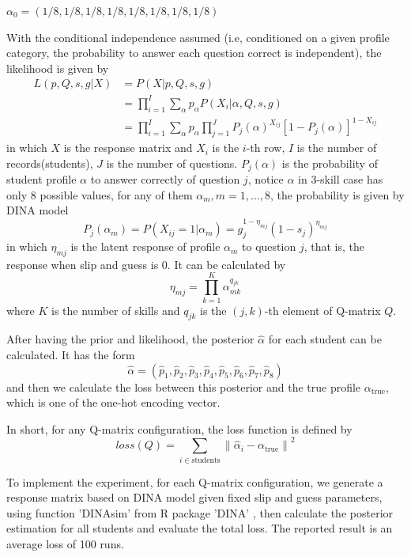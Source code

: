 \documentclass{edm_template}
\begin{document}
$\alpha_0=(1/8,1/8,1/8,1/8,1/8,1/8,1/8,1/8)$ 

With the conditional independence assumed (i.e, conditioned on a given profile category, the probability to answer each question correct is independent), the likelihood is given by \cite{de2009dina} \cite{chen2015statistical}
\begin{equation}
\begin{split}
L(p,Q,s,g|X) & = P(X|p,Q,s,g) \\
& = \prod_{i=1}^I \sum_{\alpha}p_{\alpha}P(X_i|\alpha, Q, s, g) \\
& = \prod_{i=1}^I \sum_{\alpha}p_{\alpha} \prod_{j=1}^J P_j(\alpha)^{X_{ij}}[1-P_j(\alpha)]^{1-X_{ij}}
\end{split}
\end{equation}
in which $X$ is the response matrix and $X_i$ is the $i$-th row, $I$ is the number of records(students), $J$ is the  number of questions. $P_j(\alpha)$ is the probability of student profile $\alpha$ to answer correctly of question $j$, notice $\alpha$ in 3-skill case has only 8 possible values, for any of them $\alpha_m, m =1,...,8$, the probability is given by DINA model
$$ P_j(\alpha_m) = P(X_{ij}=1|\alpha_m)=g_j^{1-\eta_{mj}}(1-s_j)^{\eta_{mj}}$$
in which $\eta_{mj}$ is the latent response of profile $\alpha_m$ to question $j$, that is, the response when slip and guess is 0. It can be calculated by 
$$\eta_{mj} = \prod_{k=1}^K \alpha_{mk}^{q_{jk}}$$
where $K$ is the number of skills and $q_{jk}$ is the $(j,k)$-th element of Q-matrix $Q$.

After having the prior and likelihood, the posterior $\hat{\alpha}$ for each student can be calculated. It has the form
$$\hat{\alpha} = (\hat{p}_1,\hat{p}_2,\hat{p}_3,\hat{p}_4,\hat{p}_5,\hat{p}_6,\hat{p}_7,\hat{p}_8)$$ 
and then we calculate the loss between this posterior and the true profile $\alpha_{\mathrm{true}}$, which is one of the one-hot encoding vector. 

In short, for any Q-matrix configuration, the loss function is defined by
\newcommand\norm[1]{\left\lVert#1\right\rVert}
$$ loss(Q) = \sum_{i \in \mathrm{students}} \norm{\hat{\alpha}_i - \alpha_{\mathrm{true}}}^2$$ 

To implement the experiment, for each Q-matrix configuration, we generate a response matrix based on DINA model given fixed slip and guess parameters, using function 'DINAsim' from R package 'DINA' \cite{Culpepper2015}, then calculate the posterior estimation for all students and evaluate the total loss. The reported result is an average loss of 100 runs. 
\end{document}
